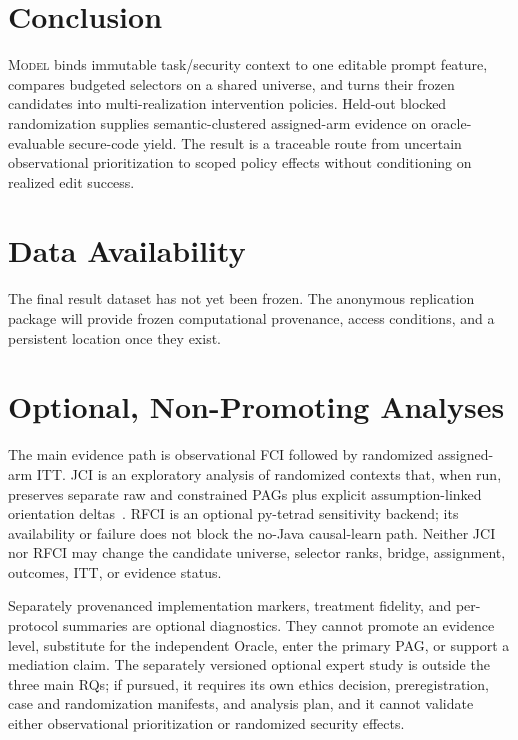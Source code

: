 \documentclass[acmsmall,screen,review,anonymous]{acmart}
\newcommand{\model}{\textsc{Model}\xspace}
\begin{document}
\section{Conclusion}

\model binds immutable task/security context to one editable prompt feature,
compares budgeted selectors on a shared universe, and turns their frozen
candidates into multi-realization intervention policies. Held-out blocked
randomization supplies semantic-clustered assigned-arm evidence on
oracle-evaluable secure-code yield. The result is a traceable route from
uncertain observational prioritization to scoped policy effects without
conditioning on realized edit success.

\section{Data Availability}

The final result dataset has not yet been frozen. The anonymous replication
package will provide frozen computational provenance, access conditions, and a
persistent location once they exist.

\appendix

\section{Optional, Non-Promoting Analyses}

The main evidence path is observational FCI followed by randomized assigned-arm
ITT. JCI is an exploratory analysis of randomized contexts that, when run,
preserves separate raw and constrained PAGs plus explicit assumption-linked
orientation deltas~\cite{mooij2020jci}. RFCI is an optional py-tetrad
sensitivity backend; its availability or failure does not block the no-Java
causal-learn path. Neither JCI nor RFCI may change the candidate universe,
selector ranks, bridge, assignment, outcomes, ITT, or evidence status.

Separately provenanced implementation markers, treatment fidelity, and
per-protocol summaries are optional diagnostics. They cannot promote an
evidence level, substitute for the independent Oracle, enter the primary PAG,
or support a mediation claim. The separately versioned optional expert study
is outside the three main RQs; if pursued, it requires its own ethics decision,
preregistration, case and randomization manifests, and analysis plan, and it
cannot validate either observational prioritization or randomized security
effects.



\end{document}
